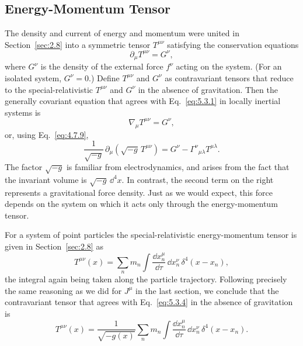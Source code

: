 
\subsection{Energy-Momentum Tensor}\label{sec:5.3}

The density and current of energy and momentum were united in
Section~\ref{sec:2.8} into a symmetric tensor \(T^{\mu\nu}\) satisfying the
conservation equations
\begin{equation}
  \partial_\mu T^{\mu\nu}=G^\nu,
  \tag{5.3.1}\label{eq:5.3.1}
\end{equation}
where \(G^\nu\) is the density of the external force \(f^\nu\) acting on the
system. (For an isolated system, \(G^\nu=0\).) Define \(T^{\mu\nu}\) and
\(G^\nu\) as contravariant tensors that reduce to the special-relativistic
\(T^{\mu\nu}\) and \(G^\nu\) in the absence of gravitation. Then the
generally covariant equation that agrees with Eq.~\eqref{eq:5.3.1} in
locally inertial systems is
\begin{equation}
  \nabla_\mu T^{\mu\nu}=G^\nu,
  \tag{5.3.2}\label{eq:5.3.2}
\end{equation}
or, using Eq.~\eqref{eq:4.7.9},
\begin{equation}
  \frac{1}{\sqrt{-g}}\,
  \partial_\mu\!\left(\sqrt{-g}\,T^{\mu\nu}\right)
  =
  G^\nu
  -
  \Gamma^\nu{}_{\mu\lambda}T^{\mu\lambda}.
  \tag{5.3.3}\label{eq:5.3.3}
\end{equation}
The factor \(\sqrt{-g}\) is familiar from electrodynamics, and arises from
the fact that the invariant volume is \(\sqrt{-g}\,\dd^4x\). In contrast,
the second term on the right represents a gravitational force density. Just
as we would expect, this force depends on the system on which it acts only
through the energy-momentum tensor.

For a system of point particles the special-relativistic energy-momentum
tensor is given in Section~\ref{sec:2.8} as
\begin{equation}
  T^{\mu\nu}(x)
  =
  \sum_n m_n
  \int
  \frac{\dd x_n^\mu}{\dd\tau}\,
  \dd x_n^\nu\,
  \delta^4\!\left(x-x_n\right),
  \tag{5.3.4}\label{eq:5.3.4}
\end{equation}
the integral again being taken along the particle trajectory. Following
precisely the same reasoning as we did for \(J^\mu\) in the last section, we
conclude that the contravariant tensor that agrees with
Eq.~\eqref{eq:5.3.4} in the absence of gravitation is
\begin{equation}
  T^{\mu\nu}(x)
  =
  \frac{1}{\sqrt{-g(x)}}
  \sum_n m_n
  \int
  \frac{\dd x_n^\mu}{\dd\tau}\,
  \dd x_n^\nu\,
  \delta^4\!\left(x-x_n\right).
  \tag{5.3.5}\label{eq:5.3.5}
\end{equation}

